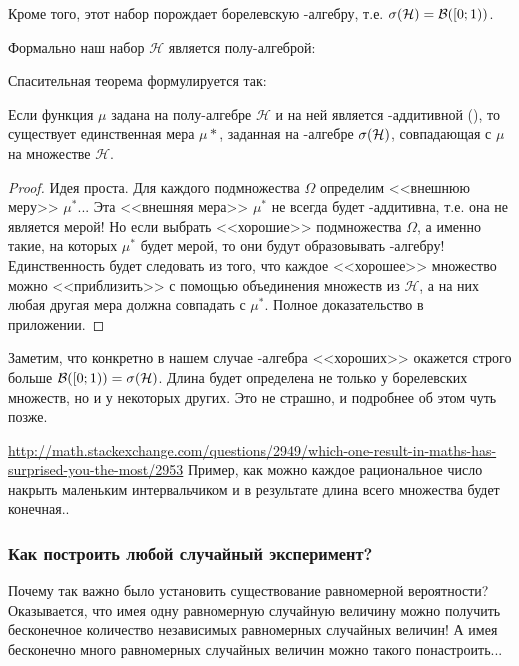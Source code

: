 {Кроме того, этот набор порождает борелевскую \s-алгебру, т.е. $\sigma(\mathcal{H})=\mathcal{B} ([0;1))$. 

Формально наш набор $\mathcal{H}$ является полу-алгеброй:

\begin{mydef}

\end{mydef}

Спасительная теорема формулируется так:

\begin{myth}[Каратеодори]
Если функция $\mu$ задана на полу-алгебре $\mathcal{H}$ и на ней является \s-аддитивной (), то существует единственная мера $\mu{*}$, заданная на \s-алгебре $\sigma(\mathcal{H})$, совпадающая с $\mu$ на множестве $\mathcal{H}$.
\end{myth}

\begin{proof} Идея проста. Для каждого подмножества $\Omega$ определим <<внешнюю меру>> $\mu^{*}$... Эта <<внешняя мера>> $\mu^{*}$ не всегда будет \s-аддитивна, т.е. она не является мерой! Но если выбрать <<хорошие>> подмножества $\Omega$, а именно такие, на которых $\mu^{*}$ будет мерой, то они будут образовывать \s-алгебру! Единственность будет следовать из того, что каждое <<хорошее>> множество можно <<приблизить>> с помощью объединения множеств из $\mathcal{H}$, а на них любая другая мера должна совпадать с $\mu^{*}$. Полное доказательство в приложении.
\end{proof}
Заметим, что конкретно в нашем случае \s-алгебра <<хороших>> окажется строго больше $\mathcal{B}([0;1))=\sigma(\mathcal{H})$. Длина будет определена не только у борелевских множеств, но и у некоторых других. Это не страшно, и подробнее об этом чуть позже.


\begin{myex}
\url{http://math.stackexchange.com/questions/2949/which-one-result-in-maths-has-surprised-you-the-most/2953}
Пример, как можно каждое рациональное число накрыть маленьким интервальчиком и в результате длина всего множества будет конечная..
\end{myex}




\subsubsection*{Как построить любой случайный эксперимент?}

Почему так важно было установить существование равномерной вероятности? Оказывается, что имея одну равномерную случайную величину можно получить бесконечное количество независимых равномерных случайных величин! А имея бесконечно много равномерных случайных величин можно такого понастроить... 

}
